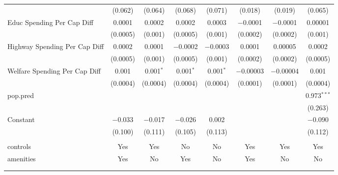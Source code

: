 \begin{table}[!htbp]
\begin{tabular}{@{\extracolsep{5pt}}lccccccc}
  & (0.062) & (0.064) & (0.068) & (0.071) & (0.018) & (0.019) & (0.065) \\ 
  Educ Spending Per Cap Diff & 0.0001 & 0.0002 & 0.0002 & 0.0003 & $-$0.0001 & $-$0.0001 & 0.00001 \\ 
  & (0.0005) & (0.001) & (0.0005) & (0.001) & (0.0002) & (0.0002) & (0.001) \\ 
  Highway Spending Per Cap Diff & 0.0002 & 0.0001 & $-$0.0002 & $-$0.0003 & 0.0001 & 0.00005 & 0.0002 \\ 
  & (0.0005) & (0.001) & (0.0005) & (0.001) & (0.0002) & (0.0002) & (0.0005) \\ 
  Welfare Spending Per Cap Diff & 0.001 & 0.001$^{*}$ & 0.001$^{*}$ & 0.001$^{*}$ & $-$0.00003 & $-$0.00004 & 0.001 \\ 
  & (0.0004) & (0.0004) & (0.0004) & (0.0004) & (0.0001) & (0.0001) & (0.0004) \\ 
  pop.pred &  &  &  &  &  &  & 0.973$^{***}$ \\ 
  &  &  &  &  &  &  & (0.263) \\ 
  Constant & $-$0.033 & $-$0.017 & $-$0.026 & 0.002 &  &  & $-$0.090 \\ 
  & (0.100) & (0.111) & (0.105) & (0.113) &  &  & (0.112) \\ 
 \hline \\[-1.8ex] 
controls & Yes & Yes & No & No & Yes & Yes & Yes \\ 
amenities & Yes & No & Yes & No & Yes & No & No \\ 
\hline \\[-1.8ex] 
\hline 
\hline \\[-1.8ex] 
\end{tabular} 
\end{table} 
